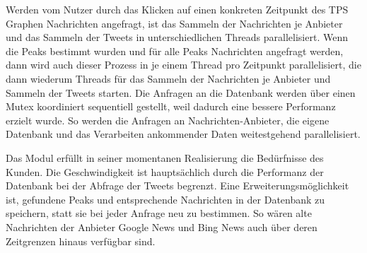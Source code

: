 Werden vom Nutzer durch das Klicken auf einen konkreten Zeitpunkt des TPS Graphen Nachrichten angefragt, ist das Sammeln der Nachrichten je Anbieter und das Sammeln der Tweets in unterschiedlichen Threads parallelisiert. Wenn die Peaks bestimmt wurden und für alle Peaks Nachrichten angefragt werden, dann wird auch dieser Prozess in je einem Thread pro Zeitpunkt parallelisiert, die dann wiederum Threads für das Sammeln der Nachrichten je Anbieter und Sammeln der Tweets starten. Die Anfragen an die Datenbank werden über einen Mutex koordiniert sequentiell gestellt, weil dadurch eine bessere Performanz erzielt wurde. So werden die Anfragen an Nachrichten-Anbieter, die eigene Datenbank und das Verarbeiten ankommender Daten weitestgehend parallelisiert.

Das Modul erfüllt in seiner momentanen Realisierung die Bedürfnisse des Kunden. Die Geschwindigkeit ist hauptsächlich durch die Performanz der Datenbank bei der Abfrage der Tweets begrenzt. Eine Erweiterungsmöglichkeit ist, gefundene Peaks und entsprechende Nachrichten in der Datenbank zu speichern, statt sie bei jeder Anfrage neu zu bestimmen. So wären alte Nachrichten der Anbieter Google News und Bing News auch über deren Zeitgrenzen hinaus verfügbar sind.